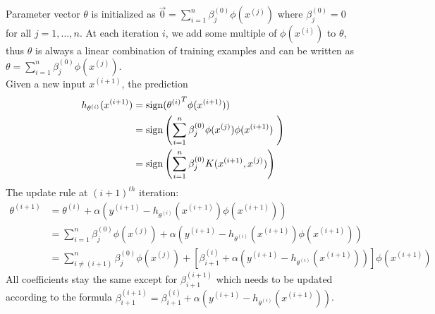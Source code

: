 \begin{answer}
Parameter vector $\theta$ is initialized as $\vec{0} = \sum_{i=1}^{n}\beta_j^{(0)} \phi(x^{(j)})$ where $\beta_j^{(0)} = 0$ for all $j=1,\dots,n$. At each iteration $i$, we add some multiple of $\phi(x^{(i)})$ to $\theta$, thus $\theta$ is always a linear combination of training examples and can be written as $\theta = \sum_{i=1}^{n}\beta_j^{(0)} \phi(x^{(j)})$. \\
Given a new input $x^{(i+1)}$, the prediction
\begin{align}
	h_{\theta^{(i)}}(x^{(i+1)}) 
	&= \text{sign}({\theta^{(i)}}^T \phi(x^{(i+1)})) \\
	&= \text{sign} \left( \sum \limits_{i=1}^{n} \beta_j^{(0)} \phi(x^{(j)}) \phi(x^{(i+1)})\ \right) \\
	&= \text{sign} \left( \sum \limits_{i=1}^{n} \beta_j^{(0)} K(x^{(i+1)},x^{(j)}) \right)
\end{align}
The update rule at $(i+1)^{th}$ iteration:
\begin{align}
	\theta^{(i+1)} 
	&= \theta^{(i)} + \alpha \left( y^{(i+1)} - h_{\theta^{(i)}}(x^{(i+1)}) \phi(x^{(i+1)}) \right) \\
	&= \sum_{i=1}^{n}\beta_j^{(0)} \phi(x^{(j)}) + \alpha \left( y^{(i+1)} - h_{\theta^{(i)}}(x^{(i+1)}) \phi(x^{(i+1)}) \right) \\
	&= \sum_{i\ne (i+1)}^{n}\beta_j^{(0)} \phi(x^{(j)}) + \left[ \beta_{i+1}^{(i)} + \alpha \left( y^{(i+1)} - h_{\theta^{(i)}}(x^{(i+1)}) \right) \right] \phi(x^{(i+1)}) 
\end{align}
All coefficients stay the same except for $\beta_{i+1}^{(i+1)}$ which needs to be updated according to the formula $\beta_{i+1}^{(i+1)} = \beta_{i+1}^{(i)} + \alpha \left( y^{(i+1)} - h_{\theta^{(i)}}(x^{(i+1)}) \right)$. \\
\end{answer}
